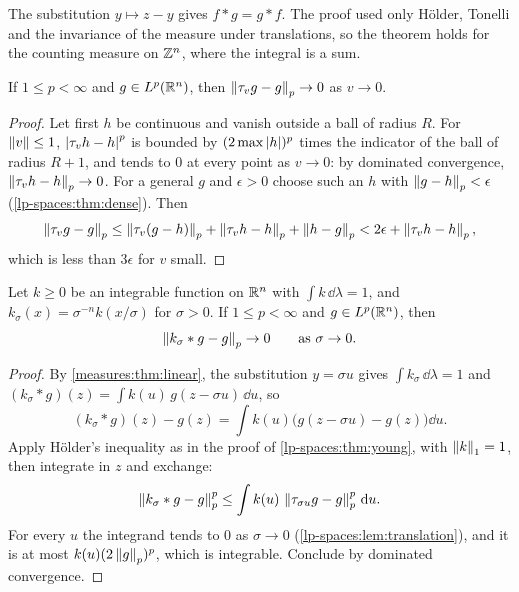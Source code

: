 \begin{notechapter}
The substitution $y\mapsto z - y$ gives $f*g = g*f$. The proof used
only H\"older, Tonelli and the invariance of the measure under
translations, so the theorem holds for the counting measure on $\mathbb{Z}^n$,
where the integral is a sum.

\begin{lemma}
\label{lp-spaces:lem:translation}
If $1\leq p < \infty$ and $g\in L^p(\mathbb{R}^n)$, then
$\left\|\tau_vg - g\right\|_p\to0$ as $v\to0$.
\end{lemma}

\begin{proof}
Let first $h$ be continuous and vanish outside a ball of radius $R$.
For $\left\|v\right\|\leq1$, $\left|\tau_vh - h\right|^p$ is bounded by
$(2\max\left|h\right|)^p$ times the indicator of the ball of radius $R + 1$,
and tends to $0$ at every point as $v\to0$: by dominated convergence,
$\left\|\tau_vh - h\right\|_p\to0$. For a general $g$ and $\epsilon > 0$ choose
such an $h$ with $\left\|g - h\right\|_p < \epsilon$
(\cref{lp-spaces:thm:dense}). Then
\[
  \left\|\tau_vg - g\right\|_p
  \leq\left\|\tau_v(g - h)\right\|_p + \left\|\tau_vh - h\right\|_p + \left\|h - g\right\|_p
  < 2\epsilon + \left\|\tau_vh - h\right\|_p ,
\]
which is less than $3\epsilon$ for $v$ small.
\end{proof}

\begin{theorem}
\label{lp-spaces:thm:mollifier}
Let $k\geq0$ be an integrable function on $\mathbb{R}^n$ with
$\int k\,\dd\lambda = 1$, and $k_\sigma(x) = \sigma^{-n}k(x/\sigma)$ for
$\sigma > 0$. If $1\leq p < \infty$ and $g\in L^p(\mathbb{R}^n)$, then
\[
  \left\|k_\sigma*g - g\right\|_p\to0\qquad\text{as }\sigma\to0 .
\]
\end{theorem}

\begin{proof}
By \cref{measures:thm:linear}, the substitution $y = \sigma u$ gives
$\int k_\sigma\,\dd\lambda = 1$ and
$(k_\sigma*g)(z) = \int k(u)\,g(z - \sigma u)\,\dd u$, so
\[
  (k_\sigma*g)(z) - g(z)
  = \int k(u)\bigl(g(z - \sigma u) - g(z)\bigr)\dd u .
\]
Apply H\"older's inequality as in the proof of
\cref{lp-spaces:thm:young}, with $\left\|k\right\|_1 = 1$, then integrate in $z$
and exchange:
\[
  \left\|k_\sigma*g - g\right\|_p^p
  \leq\int k(u)\,\left\|\tau_{\sigma u}g - g\right\|_p^p\,\mathrm{d} u .
\]
For every $u$ the integrand tends to $0$ as $\sigma\to0$
(\cref{lp-spaces:lem:translation}), and it is at most
$k(u)(2\left\|g\right\|_p)^p$, which is integrable. Conclude by dominated
convergence.
\end{proof}


\end{notechapter}
